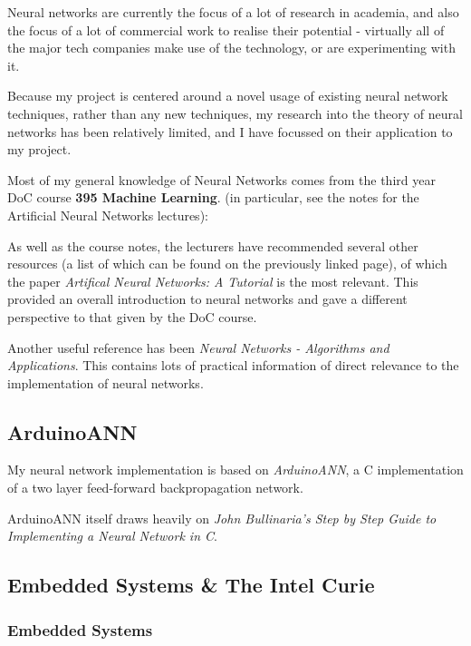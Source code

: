 \documentclass[a4paper]{article}
\begin{document}
Neural networks are currently the focus of a lot of research in academia, and also the focus of a lot of commercial work to realise their potential - virtually all of the major tech companies make use of the technology, or are experimenting with it.

Because my project is centered around a novel usage of existing neural network techniques, rather than any new techniques, my research into the theory of neural networks has been relatively limited, and I have focussed on their application to my project.

Most of my general knowledge of Neural Networks comes from the third year DoC course \textbf{395 Machine Learning}\cite{bgref0}. (in particular, see the notes for the Artificial Neural Networks lectures):

As well as the course notes, the lecturers have recommended several other resources (a list of which can be found on the previously linked page), of which the paper \textit{Artifical Neural Networks: A Tutorial}\cite{bgref1} is the most relevant. This provided an overall introduction to neural networks and gave a different perspective to that given by the DoC course.

Another useful reference has been \textit{Neural Networks - Algorithms and Applications}\cite{bgref2}. This contains lots of practical information of direct relevance to the implementation of neural networks.

\subsection{ArduinoANN}%

My neural network implementation is based on \textit{ArduinoANN}\cite{bgref3}, a C implementation of a two layer feed-forward backpropagation network. 

ArduinoANN itself draws heavily on \textit{John Bullinaria's Step by Step Guide to Implementing a Neural Network in C}\cite{bgref4}.

\subsection{Embedded Systems \& The Intel Curie}%

\subsubsection{Embedded Systems}
\end{document}
